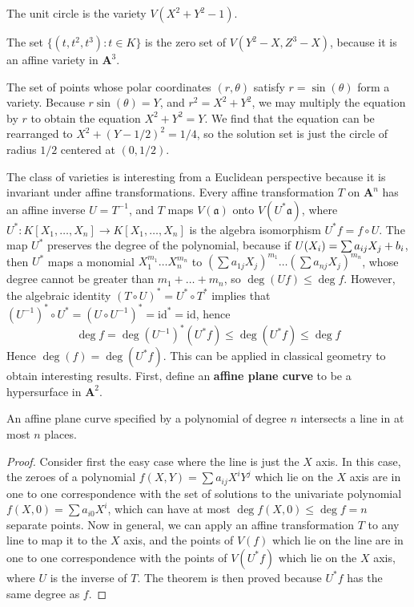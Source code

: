 \begin{example}
    The unit circle is the variety $V(X^2 + Y^2 - 1)$.
\end{example}

\begin{example}
    The set $\{ (t,t^2,t^3): t \in K \}$ is the zero set of $V(Y^2 - X, Z^3 - X)$, because it is an affine variety in $\mathbf{A}^3$.
\end{example}

\begin{example}
    The set of points whose polar coordinates $(r,\theta)$ satisfy $r = \sin(\theta)$ form a variety. Because $r \sin(\theta) = Y$, and $r^2 = X^2 + Y^2$, we may multiply the equation by $r$ to obtain the equation $X^2 + Y^2 = Y$. We find that the equation can be rearranged to $X^2 + (Y-1/2)^2 = 1/4$, so the solution set is just the circle of radius $1/2$ centered at $(0,1/2)$.
\end{example}

The class of varieties is interesting from a Euclidean perspective because it is invariant under affine transformations. Every affine transformation $T$ on $\mathbf{A}^n$ has an affine inverse $U = T^{-1}$, and $T$ maps $V(\mathfrak{a})$ onto $V(U^* \mathfrak{a})$, where $U^*: K[X_1, \dots, X_n] \to K[X_1, \dots, X_n]$ is the algebra isomorphism $U^*f = f \circ U$. The map $U^*$ preserves the degree of the polynomial, because if $U(X_i) = \smash{\sum a_{ij} X_j} + b_i$, then $U^*$ maps a monomial $X_1^{m_1} \dots X_n^{m_n}$ to $(\sum a_{1j} X_j)^{m_1} \dots (\sum a_{nj} X_j)^{m_n}$, whose degree cannot be greater than $m_1 + \dots + m_n$, so $\deg(Uf) \leq \deg f$. However, the algebraic identity $(T \circ U)^* = U^* \circ T^*$ implies that $(U^{-1})^* \circ U^* = (U \circ U^{-1})^* = \text{id}^* = \text{id}$, hence
%
\[ \deg f = \deg (U^{-1})^*(U^* f) \leq \deg(U^* f) \leq \deg f \]
%
Hence $\deg(f) = \deg(U^* f)$. This can be applied in classical geometry to obtain interesting results. First, define an {\bf affine plane curve} to be a hypersurface in $\mathbf{A}^2$.

\begin{theorem}
    An affine plane curve specified by a polynomial of degree $n$ intersects a line in at most $n$ places.
\end{theorem}
\begin{proof}
    Consider first the easy case where the line is just the $X$ axis. In this case, the zeroes of a polynomial $f(X,Y) = \sum a_{ij} X^iY^j$ which lie on the $X$ axis are in one to one correspondence with the set of solutions to the univariate polynomial $f(X,0) = \sum a_{i0} X^i$, which can have at most $\deg f(X,0) \leq \deg f = n$ separate points. Now in general, we can apply an affine transformation $T$ to any line to map it to the $X$ axis, and the points of $V(f)$ which lie on the line are in one to one correspondence with the points of $V(U^*f)$ which lie on the $X$ axis, where $U$ is the inverse of $T$. The theorem is then proved because $U^* f$ has the same degree as $f$.
\end{proof}

